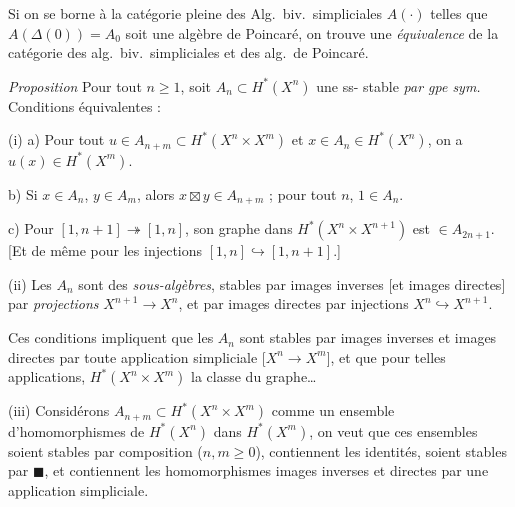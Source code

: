 \documentclass[11pt,a4paper]{article}
\begin{document}
Si  on se borne à la catégorie
pleine des Alg.\ biv.\ simpliciales $A(\cdot)$ telles que
$A(\Delta(0)) = A_{0}$ soit une algèbre de Poincaré, on trouve une
\emph{équivalence} de la catégorie des alg.\ biv.\ simpliciales et des alg.\ de
Poincaré.


\emph{Proposition} Pour tout $n \geq 1$, soit $A_{n} \subset H^{*}(X^{n})$ une
ss- \struck{\ill{}} stable \emph{par gpe sym.} Conditions
équivalentes :

(i) a) Pour tout  $u \in A_{n+m} \subset H^{*}(X^{n} \times X^{m})$
et $x \in A_{n} \in H^{*}(X^{n})$, on a $u(x) \in H^{*}(X^{m})$.

b) Si $x \in A_{n}$, $y \in A_{m}$, alors $x \boxtimes y \in A_{n+m}$ ; pour
tout $n$, $1 \in A_{n}$.

c) Pour  
$[1, n+1] \twoheadrightarrow [1, n]$, son graphe dans
$H^{*}(X^{n} \times X^{n+1})$ est $\in A_{2n+1}$.
[Et de même pour les injections $[1, n] \hookrightarrow [1, n+1]$.]

(ii) Les  $A_{n}$ sont des \emph{sous-algèbres}, stables
par images inverses [et images directes] par \emph{projections}
$X^{n+1} \to X^{n}$, et  par images directes par
injections $X^{n} \hookrightarrow X^{n+1}$.

Ces conditions impliquent que les $A_{n}$ sont stables par images inverses et
images directes par toute application simpliciale [$X^{n} \to X^{m}$], et que
 \ill{} pour telles applications,
$H^{*}(X^{n} \times X^{m})$  la classe du graphe…

(iii) Considérons $A_{n+m} \subset H^{*}(X^{n} \times X^{m})$ comme un ensemble
d'homomorphismes de $H^{*}(X^{n})$ dans $H^{*}(X^{m})$, on veut que ces
ensembles soient stables par composition ($n, m \geq 0$), contiennent les
identités, soient stables par $\blacksquare$, et contiennent les homomorphismes
images inverses et directes par une application simpliciale.
\end{document}
